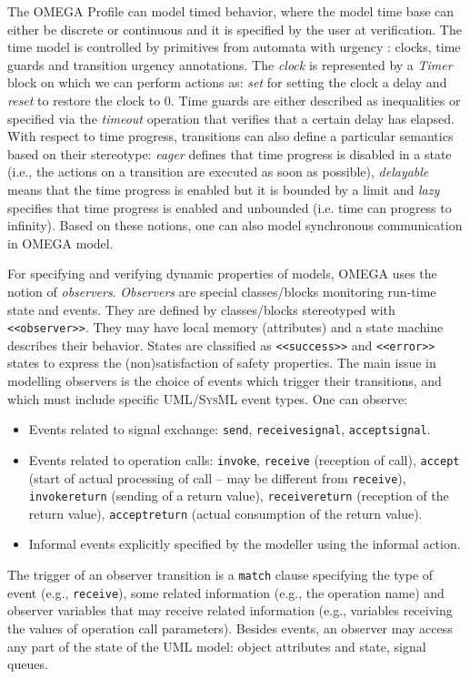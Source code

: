 \documentclass[a4paper,twoside]{article}
\def\sysml{\textsc{SysML}}
\def\uml{\textsc{UML}}
\begin{document}
The OMEGA Profile can model timed behavior, where the model time base can either be discrete or continuous and it is specified by the user at verification. The time model is controlled by primitives from automata with urgency \cite{test12}: clocks, time guards and transition urgency annotations. The \textit{clock} is represented by a \textit{Timer} block on which we can perform actions as: \textit{set} for setting the clock a delay and \textit{reset} to restore the clock to 0. Time guards are either described as inequalities or specified via the \textit{timeout} operation  that verifies that a certain delay has elapsed. With respect to time progress, transitions can also define a particular semantics based on their stereotype: \textit{eager} defines that time progress is disabled in a state (i.e., the actions on a transition are executed as soon as possible), \textit{delayable} means that the time progress is enabled but it is bounded by a limit and \textit{lazy} specifies that time progress is enabled and unbounded (i.e. time can progress to infinity). Based on these notions, one can also model synchronous communication in OMEGA model.


For specifying and verifying dynamic properties of models, OMEGA uses the notion of \textit{observers}. \textit{Observers} are special classes/blocks monitoring run-time state and events. They are defined by classes/blocks stereotyped with \texttt{<<observer>>}. They may have local memory (attributes) and a state machine describes their behavior. States are classified as \texttt{<<success>>} and \texttt{<<error>>} states to express the (non)satisfaction of safety properties. The main issue in modelling observers is the choice of events which trigger their transitions, and which must include specific \uml{}/\sysml{} event types. One can observe:

\begin{itemize}
\item Events related to signal exchange: \texttt{send}, \texttt{receivesignal}, \texttt{acceptsignal}.
\item Events related to operation calls: \texttt{invoke}, \texttt{receive} (reception of call), \texttt{accept} (start of actual processing of call -- may be different from \texttt{receive}), \texttt{invokereturn} (sending of a 
return 	value), \texttt{receivereturn} (reception of the return value), \texttt{acceptreturn} (actual consumption of the return value).
\item Informal events explicitly specified by the modeller using the informal action.
\end{itemize}
The trigger of an observer transition is a \texttt{match} clause specifying the type of event (e.g., \texttt{receive}), some related information (e.g., the operation name) and observer variables that may receive related information (e.g., variables receiving the values of operation call parameters). Besides events, an observer may access any part of the state of the \uml{} model: object attributes and state, signal queues. 
\end{document}
